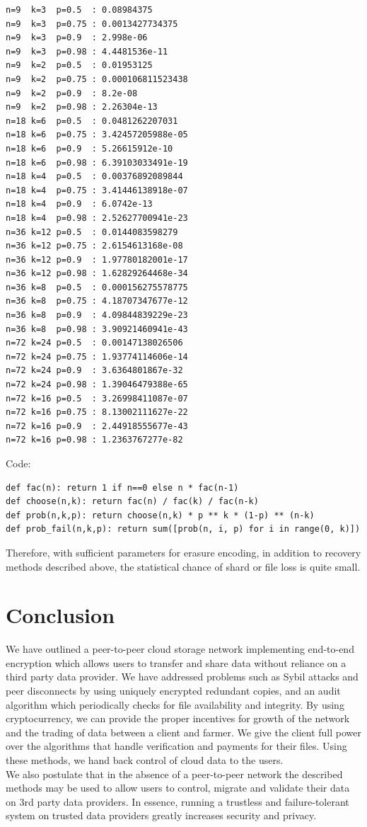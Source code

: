 \documentclass[a4paper,10pt]{article}
\begin{document}
\begin{lstlisting}
n=9  k=3  p=0.5  : 0.08984375
n=9  k=3  p=0.75 : 0.0013427734375
n=9  k=3  p=0.9  : 2.998e-06
n=9  k=3  p=0.98 : 4.4481536e-11
n=9  k=2  p=0.5  : 0.01953125
n=9  k=2  p=0.75 : 0.000106811523438
n=9  k=2  p=0.9  : 8.2e-08
n=9  k=2  p=0.98 : 2.26304e-13
n=18 k=6  p=0.5  : 0.0481262207031
n=18 k=6  p=0.75 : 3.42457205988e-05
n=18 k=6  p=0.9  : 5.26615912e-10
n=18 k=6  p=0.98 : 6.39103033491e-19
n=18 k=4  p=0.5  : 0.00376892089844
n=18 k=4  p=0.75 : 3.41446138918e-07
n=18 k=4  p=0.9  : 6.0742e-13
n=18 k=4  p=0.98 : 2.52627700941e-23
n=36 k=12 p=0.5  : 0.0144083598279
n=36 k=12 p=0.75 : 2.6154613168e-08
n=36 k=12 p=0.9  : 1.97780182001e-17
n=36 k=12 p=0.98 : 1.62829264468e-34
n=36 k=8  p=0.5  : 0.000156275578775
n=36 k=8  p=0.75 : 4.18707347677e-12
n=36 k=8  p=0.9  : 4.09844839229e-23
n=36 k=8  p=0.98 : 3.90921460941e-43
n=72 k=24 p=0.5  : 0.00147138026506
n=72 k=24 p=0.75 : 1.93774114606e-14
n=72 k=24 p=0.9  : 3.6364801867e-32
n=72 k=24 p=0.98 : 1.39046479388e-65
n=72 k=16 p=0.5  : 3.26998411087e-07
n=72 k=16 p=0.75 : 8.13002111627e-22
n=72 k=16 p=0.9  : 2.44918555677e-43
n=72 k=16 p=0.98 : 1.2363767277e-82
\end{lstlisting}

Code:
\begin{lstlisting}
def fac(n): return 1 if n==0 else n * fac(n-1)
def choose(n,k): return fac(n) / fac(k) / fac(n-k) 
def prob(n,k,p): return choose(n,k) * p ** k * (1-p) ** (n-k)
def prob_fail(n,k,p): return sum([prob(n, i, p) for i in range(0, k)])
\end{lstlisting}
Therefore, with sufficient parameters for erasure encoding, in addition to recovery methods described above, the statistical chance of shard or file loss is quite small. 


\section{Conclusion}
We have outlined a peer-to-peer cloud storage network implementing end-to-end encryption which allows users to transfer and share data without reliance on a third party data provider. We have addressed problems such as Sybil attacks and peer disconnects by using uniquely encrypted redundant copies, and an audit algorithm which periodically checks for file availability and integrity. By using cryptocurrency, we can provide the proper incentives for growth of the network and the trading of data between a client and farmer. We give the client full power over the algorithms that handle verification and payments for their files. Using these methods, we hand back control of cloud data to the users. \\

We also postulate that in the absence of a peer-to-peer network the described methods may be used to allow users to control, migrate and validate their data on 3rd party data providers. In essence, running a trustless and failure-tolerant system on trusted data providers greatly increases security and privacy.\\





\begingroup
  \raggedright
  
\endgroup
\end{document}
